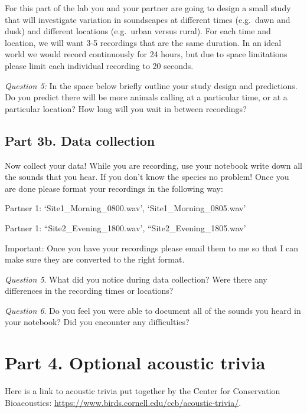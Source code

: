 \documentclass[]{book}
\begin{document}
For this part of the lab you and your partner are going to design a small study that will investigate variation in soundscapes at different times (e.g.~dawn and dusk) and different locations (e.g.~urban versus rural). For each time and location, we will want 3-5 recordings that are the same duration. In an ideal world we would record continuously for 24 hours, but due to space limitations please limit each individual recording to 20 seconds.

\emph{Question 5:} In the space below briefly outline your study design and predictions. Do you predict there will be more animals calling at a particular time, or at a particular location? How long will you wait in between recordings?

\hypertarget{part-3b.-data-collection}{%
\subsection*{Part 3b. Data collection}\label{part-3b.-data-collection}}

Now collect your data! While you are recording, use your notebook write down all the sounds that you hear. If you don't know the species no problem! Once you are done please format your recordings in the following way:

Partner 1: `Site1\_Morning\_0800.wav', `Site1\_Morning\_0805.wav'

Partner 1: ``Site2\_Evening\_1800.wav', ``Site2\_Evening\_1805.wav'

Important: Once you have your recordings please email them to me so that I can make sure they are converted to the right format.

\emph{Question 5}. What did you notice during data collection? Were there any differences in the recording times or locations?

\emph{Question 6}. Do you feel you were able to document all of the sounds you heard in your notebook? Did you encounter any difficulties?

\hypertarget{part-4.-optional-acoustic-trivia}{%
\section*{Part 4. Optional acoustic trivia}\label{part-4.-optional-acoustic-trivia}}

Here is a link to acoustic trivia put together by the Center for Conservation Bioacoustics: \url{https://www.birds.cornell.edu/ccb/acoustic-trivia/}.
\end{document}
